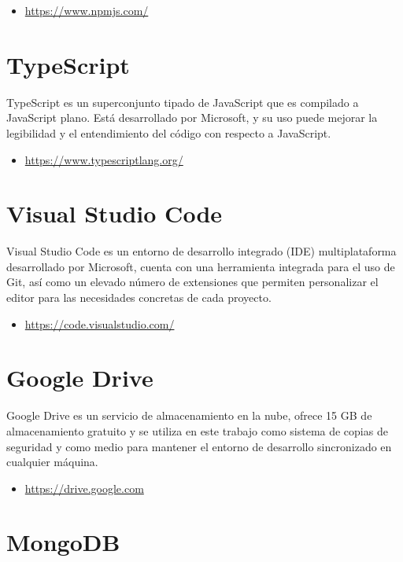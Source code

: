 \begin{itemize}
	\item \url{https://www.npmjs.com/}
\end{itemize}

\section{TypeScript}

TypeScript es un superconjunto tipado de JavaScript que es compilado a JavaScript plano. Está desarrollado por Microsoft, y su uso puede mejorar la legibilidad y el entendimiento del código con respecto a JavaScript.

\begin{itemize}
	\item \url{https://www.typescriptlang.org/}
\end{itemize}

\section{Visual Studio Code}

Visual Studio Code es un entorno de desarrollo integrado (IDE) multiplataforma desarrollado por Microsoft, cuenta con una herramienta integrada para el uso de Git, así como un elevado número de extensiones que permiten personalizar el editor para las necesidades concretas de cada proyecto.

\begin{itemize}
	\item \url{https://code.visualstudio.com/}
\end{itemize}

\section{Google Drive}

Google Drive es un servicio de almacenamiento en la nube, ofrece 15 GB de almacenamiento gratuito y se utiliza en este trabajo como sistema de copias de seguridad y como medio para mantener el entorno de desarrollo sincronizado en cualquier máquina.

\begin{itemize}
	\item \url{https://drive.google.com}
\end{itemize}

\section{MongoDB}

